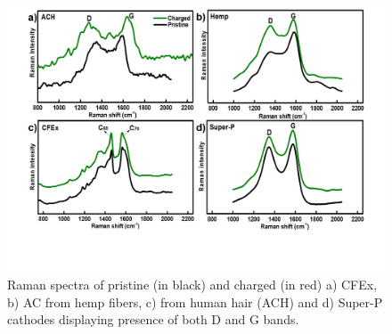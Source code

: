  \begin{figure}[tbh!]
  \centering
  \includegraphics[width=\textwidth]{Figures/chap5fig/Raman}
    \caption{Raman spectra of pristine (in black) and charged (in red) a) CFEx, b) AC from hemp fibers, c) from human hair (ACH) and d) Super-P cathodes displaying presence of both D and G bands.}
  \label{Figures/chap5fig:Raman}
\end{figure}

